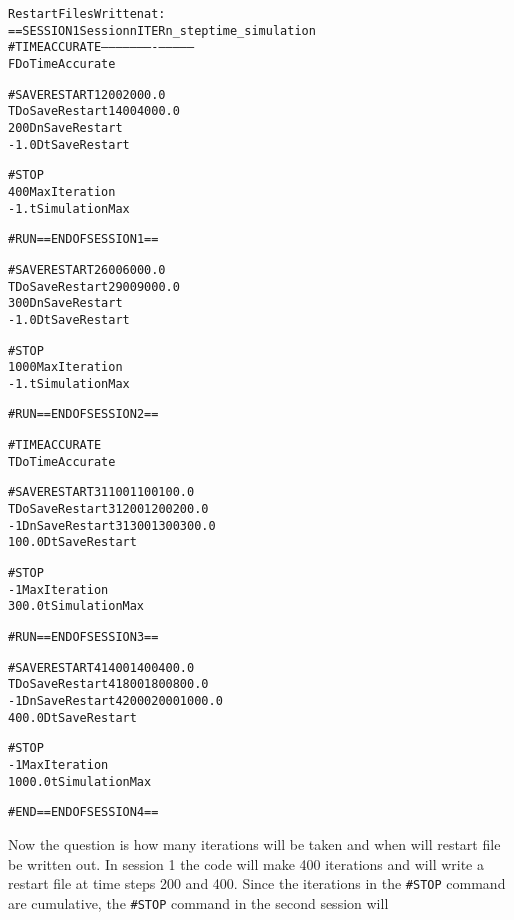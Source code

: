 \begin{alltt}
                                             Restart Files Written at:
==SESSION 1       \hfill        Session   nITER   n_step   time_simulation
#TIMEACCURATE	  \hfill        --------  ------  -------  --------------
F            DoTimeAccurate  

#SAVERESTART                      \hfill  1       200      200              0.0  
T            DoSaveRestart     \hfill  1       400      400              0.0
200          DnSaveRestart
-1.0         DtSaveRestart

#STOP
400          MaxIteration
-1.          tSimulationMax

#RUN ==END OF SESSION 1== 
                         
#SAVERESTART			  \hfill  2       600      600              0.0
T            DoSaveRestart	  \hfill  2       900      900              0.0
300          DnSaveRestart
-1.0         DtSaveRestart
				
#STOP				
1000         MaxIteration				
-1.          tSimulationMax
				
#RUN ==END OF SESSION 2== 

#TIMEACCURATE
T            DoTimeAccurate  		
				
#SAVERESTART			  \hfill  3      1100     1100            100.0
T            DoSaveRestart	  \hfill  3      1200     1200            200.0
-1           DnSaveRestart  \hfill  3      1300     1300            300.0
100.0        DtSaveRestart
				
#STOP				
-1           MaxIteration				
300.0        tSimulationMax			
				
#RUN ==END OF SESSION 3== 
                          
#SAVERESTART                \hfill   4      1400     1400            400.0
T            DoSaveRestart  \hfill   4      1800     1800            800.0
-1           DnSaveRestart  \hfill   4      2000     2000           1000.0
400.0        DtSaveRestart
 				
#STOP				
-1           MaxIteration				
1000.0       tSimulationMax				
				
#END  ==END OF SESSION 4== 
\end{alltt}
Now the question is how many iterations will be taken and when will restart
file be written out.  In session 1 the code will make 400 iterations and will
write a restart file at time steps 200 and 400.  Since the iterations 
in the {\tt \#STOP}
command are cumulative, the {\tt \#STOP} command in the second session will
